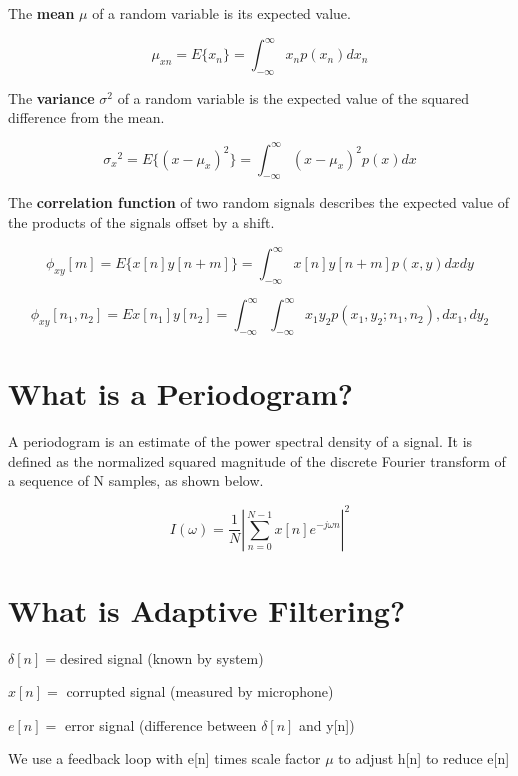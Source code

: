 \documentclass{article}
\begin{document}
	The \textbf{mean} $\mu$ of a random variable is its expected value.
	
	\begin{equation}
		\mu_{xn} = E\{x_n\} = \int_{-\infty}^{\infty}x_n p(x_n) dx_n
	\end{equation}
	
	The \textbf{variance} ${\sigma}^2$ of a random variable is the expected value of the squared difference from the mean.
	
	\begin{equation}
		{\sigma_{x}}^2 = E\{(x - \mu_x)^2\} = \int_{-\infty}^{\infty} (x - \mu_x)^2 p(x) dx
	\end{equation}
	
	The \textbf{correlation function} of two random signals describes the expected value of the products of the signals offset by a shift.
	
	\begin{equation}
		\phi_{xy} [m] = E\{x[n]y[n + m]\} = \int_{-\infty}^{\infty} x[n]y[n+m] p(x,y) dx dy
	\end{equation}
	
	\begin{equation}
		\phi_{xy}[n_1, n_2] = E{x[n_1]y[n_2]} = \int_{-\infty}^{\infty} \int_{-\infty}^{\infty} x_1 y_2 p(x_1, y_2; n_1, n_2) , dx_1 , dy_2
	\end{equation}
	
	\section{What is a Periodogram?}
	A periodogram is an estimate of the power spectral density of a signal. It is defined as the normalized squared magnitude of the discrete Fourier transform of a sequence of N samples, as shown below.
	
	\begin{equation}
		I(\omega) = \frac{1}{N} \left| \sum_{n=0}^{N-1} x[n] e^{-j \omega n} \right| ^2
	\end{equation}
	
	\section{What is Adaptive Filtering?}
	$\delta[n] = $desired signal (known by system)
	
	$x[n] = $ corrupted signal (measured by microphone)
	
	$e[n] = $ error signal (difference between $\delta[n]$ and y[n])
	
	We use a feedback loop with e[n] times scale factor $\mu$ to adjust h[n] to reduce e[n]
\end{document}
